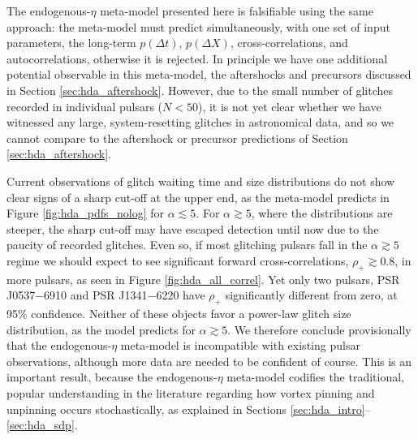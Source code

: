 The endogenous-$\eta$ meta-model presented here is falsifiable using the same approach: the meta-model must predict simultaneously, with one set of input parameters, the long-term $p(\Delta t)$, $p(\Delta X)$, cross-correlations, and autocorrelations, otherwise it is rejected. In principle we have one additional potential observable in this meta-model, the aftershocks and precursors discussed in Section \ref{sec:hda_aftershock}. However, due to the small number of glitches recorded in individual pulsars ($N < 50$), it is not yet clear whether we have witnessed any large, system-resetting glitches in astronomical data, and so we cannot compare to the aftershock or precursor predictions of Section \ref{sec:hda_aftershock}. 

Current observations of glitch waiting time and size distributions \citep{Howitt2018, Fuentes2019} do not show clear signs of a sharp cut-off at the upper end, as the meta-model predicts in Figure \ref{fig:hda_pdfs_nolog} for $\alpha \lesssim 5$. For $\alpha \gtrsim 5$, where the distributions are steeper, the sharp cut-off may have escaped detection until now due to the paucity of recorded glitches. Even so, if most glitching pulsars fall in the $\alpha \gtrsim 5$ regime we should expect to see significant forward cross-correlations, $\rho_+ \gtrsim 0.8$, in more pulsars, as seen in Figure \ref{fig:hda_all_correl}. Yet only two pulsars, PSR J0537$-$6910 and PSR J1341$-$6220 have $\rho_+$ significantly different from zero, at 95\% confidence. Neither of these objects favor a power-law glitch size distribution, as the model predicts for $\alpha \gtrsim 5$. We therefore conclude provisionally that the endogenous-$\eta$ meta-model is incompatible with existing pulsar observations, although more data are needed to be confident of course. This is an important result, because the endogenous-$\eta$ meta-model codifies the traditional, popular understanding in the literature regarding how vortex pinning and unpinning occurs stochastically, as explained in Sections \ref{sec:hda_intro}--\ref{sec:hda_sdp}.

